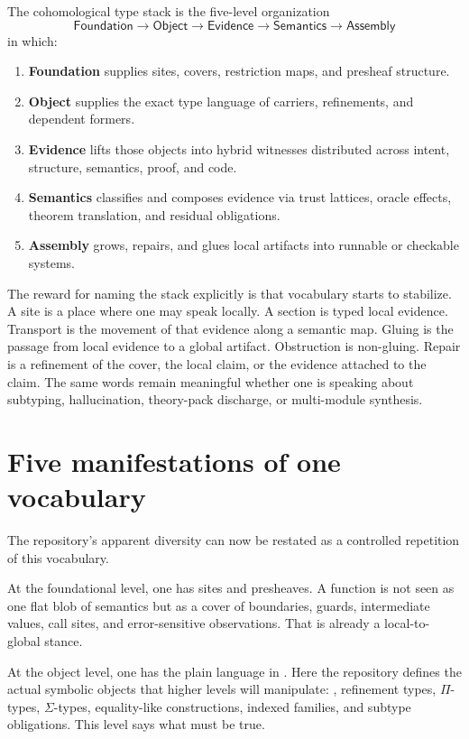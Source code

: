 \begin{definition}
The cohomological type stack is the five-level organization
\[
  \mathsf{Foundation} \to \mathsf{Object} \to \mathsf{Evidence} \to \mathsf{Semantics} \to \mathsf{Assembly}
\]
in which:
\begin{enumerate}[leftmargin=2em, itemsep=0.35em]
  \item \textbf{Foundation} supplies sites, covers, restriction maps, and presheaf structure.
  \item \textbf{Object} supplies the exact type language of carriers, refinements, and
  dependent formers.
  \item \textbf{Evidence} lifts those objects into hybrid witnesses distributed across
  intent, structure, semantics, proof, and code.
  \item \textbf{Semantics} classifies and composes evidence via trust lattices, oracle
  effects, theorem translation, and residual obligations.
  \item \textbf{Assembly} grows, repairs, and glues local artifacts into runnable or
  checkable systems.
\end{enumerate}
\end{definition}

The reward for naming the stack explicitly is that vocabulary starts to stabilize. A site is
a place where one may speak locally. A section is typed local evidence. Transport is the
movement of that evidence along a semantic map. Gluing is the passage from local evidence to
a global artifact. Obstruction is non-gluing. Repair is a refinement of the cover, the local
claim, or the evidence attached to the claim. The same words remain meaningful whether one is
speaking about subtyping, hallucination, theory-pack discharge, or multi-module synthesis.

\section*{Five manifestations of one vocabulary}
The repository's apparent diversity can now be restated as a controlled repetition of this
vocabulary.

At the foundational level, one has sites and presheaves. A function is not seen as one flat
blob of semantics but as a cover of boundaries, guards, intermediate values, call sites, and
error-sensitive observations. That is already a local-to-global stance.

At the object level, one has the plain language in . Here the
repository defines the actual symbolic objects that higher levels will manipulate:
, refinement types, $\Pi$-types, $\Sigma$-types, equality-like constructions,
indexed families, and subtype obligations. This level says what must be true.

